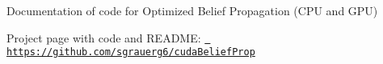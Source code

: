 \label{index_md_src_main}%
%
 Documentation of code for Optimized Belief Propagation (CPU and GPU)

Project page with code and README\+: \href{https://github.com/sgrauerg6/cudaBeliefProp}{\texttt{ https\+://github.\+com/sgrauerg6/cuda\+Belief\+Prop}} 